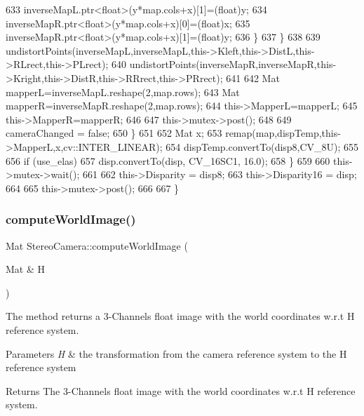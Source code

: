 \begin{DoxyCode}
633                     inverseMapL.ptr<\textcolor{keywordtype}{float}>(y*map.cols+x)[1]=(\textcolor{keywordtype}{float})y;
634                     inverseMapR.ptr<\textcolor{keywordtype}{float}>(y*map.cols+x)[0]=(\textcolor{keywordtype}{float})x;
635                     inverseMapR.ptr<\textcolor{keywordtype}{float}>(y*map.cols+x)[1]=(\textcolor{keywordtype}{float})y;
636                 \}
637             \}
638 
639             undistortPoints(inverseMapL,inverseMapL,this->Kleft,this->DistL,this->RLrect,this->PLrect);
640             undistortPoints(inverseMapR,inverseMapR,this->Kright,this->DistR,this->RRrect,this->PRrect);
641 
642             Mat mapperL=inverseMapL.reshape(2,map.rows);
643             Mat mapperR=inverseMapR.reshape(2,map.rows);
644             this->MapperL=mapperL;
645             this->MapperR=mapperR;
646 
647             this->mutex->post();
648 
649             cameraChanged = \textcolor{keyword}{false};
650         \}
651 
652         Mat x;
653         remap(map,dispTemp,this->MapperL,x,cv::INTER\_LINEAR);
654         dispTemp.convertTo(disp8,CV\_8U);
655 
656         \textcolor{keywordflow}{if} (use\_elas)
657             disp.convertTo(disp, CV\_16SC1, 16.0);
658     \}
659 
660     this->mutex->wait();
661 
662     this->Disparity = disp8;
663     this->Disparity16 = disp;
664 
665     this->mutex->post();
666 
667 \}
\end{DoxyCode}
\mbox{\label{classStereoCamera_a52ef2f3401488e5c4fa6badd1336f96d}} 
\subsubsection{\texorpdfstring{compute\+World\+Image()}{computeWorldImage()}}
{\footnotesize\ttfamily Mat Stereo\+Camera\+::compute\+World\+Image (\begin{DoxyParamCaption}\item[{Mat \&}]{H }\end{DoxyParamCaption})}



The method returns a 3-\/\+Channels float image with the world coordinates w.\+r.\+t H reference system. 


\begin{DoxyParams}{Parameters}
{\em H} & the transformation from the camera reference system to the H reference system \\
\hline
\end{DoxyParams}
\begin{DoxyReturn}{Returns}
The 3-\/\+Channels float image with the world coordinates w.\+r.\+t H reference system. 
\end{DoxyReturn}


